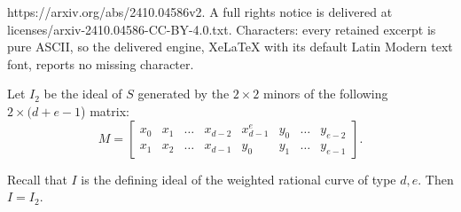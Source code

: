 \documentclass[10pt,a4paper]{amsart}
\begin{document}
https://arxiv.org/abs/2410.04586v2. A full rights notice is delivered at licenses/arxiv-2410.04586-CC-BY-4.0.txt. Characters: every retained excerpt is pure ASCII, so the delivered engine, XeLaTeX with its default Latin Modern text font, reports no missing character.
\begin{theorem}
\label{thm:determinantal}
Let $I_2$ be the ideal of $S$ generated by the $2 \times 2$ minors of the following $2 \times (d+e-1$) matrix:
\begin{equation} \label{eq:definingmatrix}
M = \begin{bmatrix}
x_0 & x_1 & \ldots & x_{d-2} & x_{d-1}^e & y_0 & \ldots & y_{e-2}\\
x_1 & x_2 & \ldots & x_{d-1} & y_0 & y_1 & \ldots & y_{e-1}
\end{bmatrix}.
\end{equation}

Recall that $I$ is the defining ideal of the weighted rational curve of type $d,e$.
Then $I = I_2$.
\end{theorem}
\end{document}
